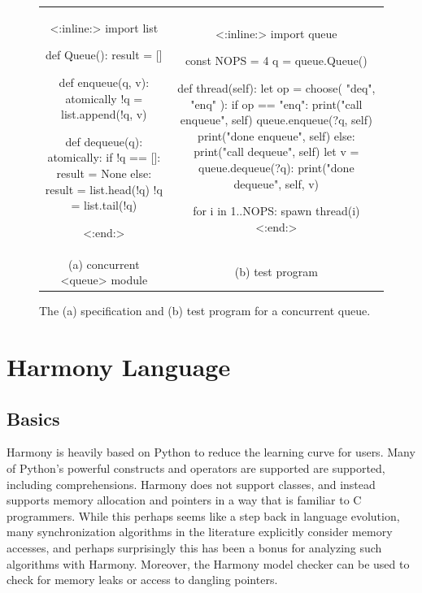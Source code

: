 \documentclass[twocolumn]{article}
\begin{document}
\begin{figure}[h]
\begin{center}
\begin{tabular}{cc}
{\footnotesize
\begin{tcolorbox}[width=0.45\linewidth]
<{:inline:}>
import list

def Queue():
    result = []

def enqueue(q, v):
    atomically !q = list.append(!q, v)

def dequeue(q):
    atomically:
        if !q == []:
            result = None
        else:
            result = list.head(!q)
            !q = list.tail(!q)


<{:end:}>
\end{tcolorbox}
}
&
{\footnotesize
\begin{tcolorbox}[width=0.48\linewidth]
<{:inline:}>
import queue

const NOPS = 4
q = queue.Queue()

def thread(self):
    let op = choose({ "deq", "enq" }):
        if op == "enq":
            print("call enqueue", self)
            queue.enqueue(?q, self)
            print("done enqueue", self)
        else:
            print("call dequeue", self)
            let v = queue.dequeue(?q):
                print("done dequeue", self, v)

for i in {1..NOPS}: spawn thread(i)
<{:end:}>
\end{tcolorbox}
}
\\
(a) concurrent <{queue}> module & (b) test program
\end{tabular}
\end{center}
\caption{The (a) specification and (b) test program for a concurrent queue.}
\label{fig:queue}
\end{figure}

\section{Harmony Language}

\subsection{Basics}

Harmony is heavily based on Python to reduce the learning curve for
users.  Many of Python's powerful constructs and operators are
supported are supported, including comprehensions.  Harmony does
not support classes, and instead supports memory allocation and
pointers in a way that is familiar to C programmers.  While this
perhaps seems like a step back in language evolution, many
synchronization algorithms in the literature explicitly consider
memory accesses, and perhaps surprisingly this has been a bonus for
analyzing such algorithms with Harmony.  Moreover, the Harmony model
checker can be used to check for memory leaks or access to dangling
pointers.
\end{document}
